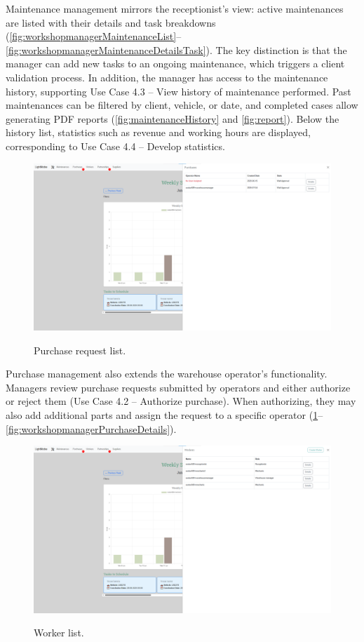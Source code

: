 Maintenance management mirrors the receptionist's view: active maintenances are listed with their details and task breakdowns (\ref{fig:workshopmanagerMaintenanceList}–\ref{fig:workshopmanagerMaintenanceDetailsTask}). The key distinction is that the manager can add new tasks to an ongoing maintenance, which triggers a client validation process. In addition, the manager has access to the maintenance history, supporting Use Case 4.3 – View history of maintenance performed. Past maintenances can be filtered by client, vehicle, or date, and completed cases allow generating PDF reports (\ref{fig:maintenanceHistory} and \ref{fig:report}). Below the history list, statistics such as revenue and working hours are displayed, corresponding to Use Case 4.4 – Develop statistics.

\begin{figure}[h]
  \caption{Purchase request list.}
  \centering
  \includegraphics[width=\textwidth]{figs/Implementation/workshopmanager/purchaseList}
  \label{fig:workshopmanagerPurchaseList}
\end{figure}



Purchase management also extends the warehouse operator's functionality. Managers review purchase requests submitted by operators and either authorize or reject them (Use Case 4.2 – Authorize purchase). When authorizing, they may also add additional parts and assign the request to a specific operator (\ref{fig:workshopmanagerPurchaseList}–\ref{fig:workshopmanagerPurchaseDetails}).


\begin{figure}[h]
  \caption{Worker list.}
  \centering
  \includegraphics[width=\textwidth]{figs/Implementation/workshopmanager/workerList}
  \label{fig:workerList}
\end{figure}




